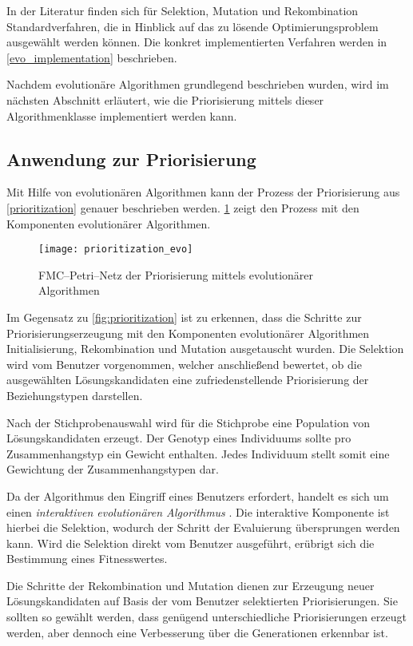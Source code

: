 In der Literatur \cite{kw2007, tw2008, dj2006} finden sich für Selektion, Mutation und Rekombination Standardverfahren, die in Hinblick auf das zu lösende Optimierungsproblem ausgewählt werden können. Die konkret implementierten Verfahren werden in \cref{evo_implementation} beschrieben.

Nachdem evolutionäre Algorithmen grundlegend beschrieben wurden, wird im nächsten Abschnitt erläutert, wie die Priorisierung mittels dieser Algorithmenklasse implementiert werden kann.

\subsection{Anwendung zur Priorisierung}
\label{prio_evo}

Mit Hilfe von evolutionären Algorithmen kann der Prozess der Priorisierung aus \cref{prioritization} genauer beschrieben werden. \cref{fig:prioritization_evo} zeigt den Prozess mit den Komponenten evolutionärer Algorithmen.

\begin{figure}
\centering
\texttt{[image: prioritization\_evo]}
\caption{FMC--Petri--Netz der Priorisierung mittels evolutionärer Algorithmen}
\label{fig:prioritization_evo}
\end{figure}

Im Gegensatz zu \cref{fig:prioritization} ist zu erkennen, dass die Schritte zur Priorisierungserzeugung mit den Komponenten evolutionärer Algorithmen Initialisierung, Rekombination und Mutation ausgetauscht wurden. Die Selektion wird vom Benutzer vorgenommen, welcher anschließend bewertet, ob die ausgewählten Lösungskandidaten eine zufriedenstellende Priorisierung der Beziehungstypen darstellen.

Nach der Stichprobenauswahl wird für die Stichprobe eine Population von Lösungskandidaten erzeugt. Der Genotyp eines Individuums sollte pro Zusammenhangstyp ein Gewicht enthalten. Jedes Individuum stellt somit eine Gewichtung der Zusammenhangstypen dar.

Da der Algorithmus den Eingriff eines Benutzers erfordert, handelt es sich um einen \emph{interaktiven evolutionären Algorithmus} \cite{ht2001}. Die interaktive Komponente ist hierbei die Selektion, wodurch der Schritt der Evaluierung übersprungen werden kann. Wird die Selektion direkt vom Benutzer ausgeführt, erübrigt sich die Bestimmung eines Fitnesswertes.

Die Schritte der Rekombination und Mutation dienen zur Erzeugung neuer Lösungskandidaten auf Basis der vom Benutzer selektierten Priorisierungen. Sie sollten so gewählt werden, dass genügend unterschiedliche Priorisierungen erzeugt werden, aber dennoch eine Verbesserung über die Generationen erkennbar ist.

